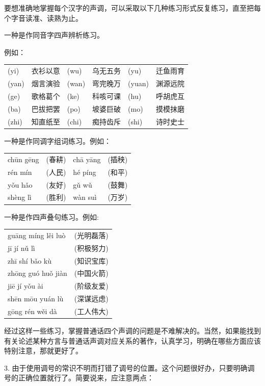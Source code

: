 要想准确地掌握每个汉字的声调，可以采取以下几种练习形式反复练习，直至把每个字音读准、读熟为止。

\noindent
一种是作同音字四声辨析练习。

例如：

\noindent
\begin{tabular}{llllll}
(yi) & 衣衫以意 & (wu) & 乌无五务 & (yu) & 迁鱼雨育\\
(yan) & 烟言演验 & (wan) & 弯完晚万 & (yuan) & 渊源远院\\
(ge) & 歌格葛个 & (ke) & 科咳可课 & (hu) & 呼胡虎互\\
(ba) & 巴拔把罢 & (po) & 坡婆巨破 & (mo) & 摸模抹磨\\
(zhi) & 知直纸至 & (chi) & 痴持齿斥 & (shi) & 诗时史士\\
\end{tabular}
\newpage

一种是作同调字组词练习。例如：

\begin{tabular}{llll}
	chūn gēng & (春耕) & chā yāng & (插秧)\\
	rén mín & (人民) & hé píng & (和平)\\
	yǒu hǎo & (友好) & gǔ wǔ & (鼓舞)\\
	shèng lì & (胜利) & wàn suì & (万岁)\\
\end{tabular}
\vspace{1em}

一种是作四声叠句练习。例如:

\begin{tabular}{ll}
	guāng míng lěi luò & (光明磊落)\\
	jī jí nǔ lì & (积极努力)\\
	zhī shí bǎo kù & (知识宝库)\\
	zhōng guó huǒ jiàn & (中国火箭)\\
	jiē jí yǒu ài & (阶级友爱)\\
	shēn mōu yuán lù & (深谋远虑)\\
	gōng rén wěi dà & (工人伟大)\\
\end{tabular}
\vspace{1em}

经过这样一些练习，掌握普通话四个声调的问题是不难解决的。当然，如果能找到有关论述某种方言与普通话声调对应关系的著作，认真学习，明确在哪些方面应该特别注意，那就更好了。

3. 由于使用调号的常识不明而打错了调号的位置。这个问题很好办，只要明确调号的正确位置就行了。简要说来，应注意两点：

